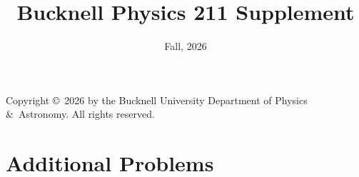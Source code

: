 \newenvironment{exercise}{
  \begin{list}{}{\leftmargin 3.5ex\labelsep 1ex}
  \item[\textbf{\theprob.}]
   \renewcommand{\labelenumi}{(\alph{enumi})}}
  {\end{list}}

\newenvironment{exercise}[1]{
  \begin{list}{}{\leftmargin 3.5ex\labelsep 1ex}
  \item[\textbf{A\theprob.}] \textbf{#1} 
   \renewcommand{\labelenumi}{(\alph{enumi})}}
  {\end{list}}

\newcommand{\Xunits}[1]{\,\mbox{#1}}


  



\frontmatter

\mbox{}
\vspace{7in}


Copyright \copyright\ 2026 by the Bucknell University Department of
Physics \&\ Astronomy.
All rights reserved. 




\title{Bucknell Physics 211 Supplement}\author{Fall, 2026}

\chapter*{Additional Problems}

